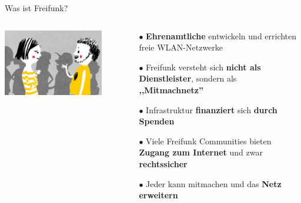 \documentclass[10pt]{beamer}
\begin{document}
    \begin{frame}{Was ist Freifunk?}
    \begin{columns}[T]
     \begin{column}{4cm}
	\vspace{1em}
    	\includegraphics[width=0.9\textwidth]{images/talk}\\
      \end{column}
      \begin{column}{6cm}
        \begin{itemize}
          \item[\textcolor{freifunkpink}{\Large$\bullet$}] \textbf{Ehrenamtliche} entwickeln und errichten freie WLAN-Netzwerke
          \item[\textcolor{freifunkpink}{\Large$\bullet$}] Freifunk versteht sich \textbf{nicht als Dienstleister}, sondern als \textbf{,,Mitmachnetz''}
          \item[\textcolor{freifunkpink}{\Large$\bullet$}] Infrastruktur \textbf{finanziert} sich \textbf{durch Spenden}
          \item[\textcolor{freifunkpink}{\Large$\bullet$}] Viele Freifunk Communities bieten \textbf{Zugang zum Internet} und zwar \textbf{rechtssicher}
          \item[\textcolor{freifunkpink}{\Large$\bullet$}] Jeder kann mitmachen und das \textbf{Netz erweitern}
        \end{itemize}
      \end{column}
    \end{columns}
   \end{frame}
\end{document}
